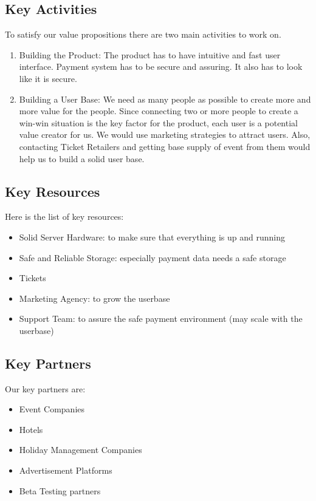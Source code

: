 \documentclass{article}
\begin{document}
\vspace{-3mm}
\subsection{Key Activities}

To satisfy our value propositions there are two main activities to work on.
\begin{enumerate}
    \item Building the Product: The product has to have intuitive and fast user interface. Payment system has to be secure and assuring. It also has to look like it is secure.
    
    \item Building a User Base: We need as many people as possible to create more and more value for the people. Since connecting two or more people to create a win-win situation is the key factor for the product, each user is a potential value creator for us. We would use marketing strategies to attract users. Also, contacting Ticket Retailers and getting base supply of event from them would help us to build a solid user base. 
    
\end{enumerate}

\vspace{-3mm}
\subsection{Key Resources}

Here is the list of key resources:
\begin{itemize}
    \item Solid Server Hardware: to make sure that everything is up and running
    \item Safe and Reliable Storage: especially payment data needs a safe storage
    \item Tickets
    \item Marketing Agency: to grow the userbase
    \item Support Team: to assure the safe payment environment (may scale with the userbase)
\end{itemize}

\vspace{-3mm}
\newpage
\subsection{Key Partners}
Our key partners are:
\begin{multicols}{2}
    \begin{itemize}
        \item Event Companies
        \item Hotels
        \item Holiday Management Companies
        \item Advertisement Platforms
        \item Beta Testing partners
    \end{itemize}
\end{multicols}
\end{document}
